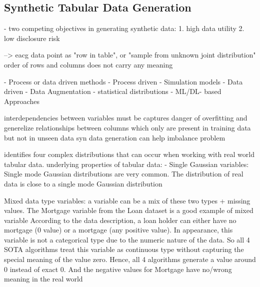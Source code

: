 \subsection{Synthetic Tabular Data Generation}

- two competing objectives in generating synthetic data: \cite{little2021GenerativeAdversarialNetworksa}
    1. high data utility \cite{little2021GenerativeAdversarialNetworksa}
    2. low disclosure risk \cite{little2021GenerativeAdversarialNetworksa}

--> eacg data point as "row in table", or "sample from unknown joint distribution"
order of rows and columns does not carry any meaning \cite{somepalli2021SAINTImprovedNeural}


- Process or data driven methods \cite{goncalves2020GenerationEvaluationSynthetic}
    - Process driven
        - Simulation models \cite{kowalczyk2022TaxonomyUseSynthetic}
    - Data driven
        - Data Augmentation \cite{kowalczyk2022TaxonomyUseSynthetic}
        - statistical distributions \cite{kowalczyk2022TaxonomyUseSynthetic}
        - ML/DL- based Approaches \cite{kowalczyk2022TaxonomyUseSynthetic}

interdependencies between variables must be captures \cite{lederrey2022DATGANIntegratingExperta}
danger of overfitting and generelize relationships between columns which only are present in training data but not in unseen data \cite{lederrey2022DATGANIntegratingExperta}
syn data generation can help imbalance problem \cite{borisov2022DeepNeuralNetworks}



\cite{zhao2022CTABGANEnhancingTabular} identifies four complex distributions that can occur when working with real world tabular data.
underlying properties of tabular data: \cite{zhao2022CTABGANEnhancingTabular}
- Single Gaussian variables:
    Single mode Gaussian distributions are very common.
    The distribution of real data is close to a single mode Gaussian distribution

Mixed data type variables:\cite{zhao2022CTABGANEnhancingTabular}
    a variable can be a mix of these two types + missing values. The Mortgage variable from the Loan dataset is a good example of mixed variable
    According to the data description, a loan holder can either have no mortgage (0 value) or a mortgage (any positive value). 
    In appearance, this variable is not a categorical type due to the numeric nature of the data. 
    So all 4 SOTA algorithms treat this variable as continuous type without capturing the special meaning of the value zero. 
    Hence, all 4 algorithms generate a value around 0 instead of exact 0. And the negative values for Mortgage have no/wrong meaning in the real world

